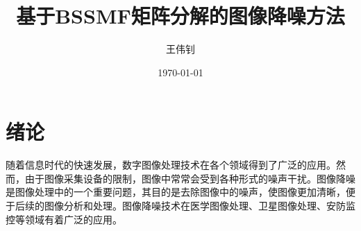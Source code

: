 \documentclass[12pt]{article}
\title{基于BSSMF矩阵分解的图像降噪方法}
\author{王伟钊}
\date{\today}
\begin{document}
\maketitle

\begin{abstract}

\end{abstract}

\newpage

\tableofcontents

\newpage

\section{绪论}
随着信息时代的快速发展，数字图像处理技术在各个领域得到了广泛的应用。然而，由于图像采集设备的限制，图像中常常会受到各种形式的噪声干扰。图像降噪是图像处理中的一个重要问题，其目的是去除图像中的噪声，使图像更加清晰，便于后续的图像分析和处理。图像降噪技术在医学图像处理、卫星图像处理、安防监控等领域有着广泛的应用。
\end{document}
